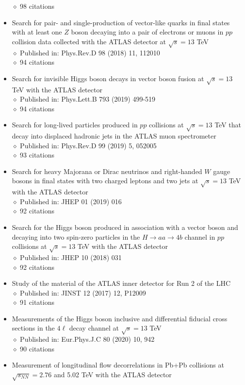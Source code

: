 \documentclass[margin, 10pt]{res} %
\begin{document}
\begin{resume}
\begin{itemize}
$\diamond$ 98 citations
\item Search for pair- and single-production of vector-like quarks in final states with at least one $Z$ boson decaying into a pair of electrons or muons in $pp$collision data collected with the ATLAS detector at $\sqrt{s} = 13$ TeV\\
$\diamond$ Published in: Phys.Rev.D 98 (2018) 11, 112010\\
$\diamond$ 94 citations
\item Search for invisible Higgs boson decays in vector boson fusion at $\sqrt{s} = 13$ TeV with the ATLAS detector\\
$\diamond$ Published in: Phys.Lett.B 793 (2019) 499-519\\
$\diamond$ 94 citations
\item Search for long-lived particles produced in $pp$ collisions at $\sqrt{s} = 13$ TeV that decay into displaced hadronic jets in the ATLAS muon spectrometer\\
$\diamond$ Published in: Phys.Rev.D 99 (2019) 5, 052005\\
$\diamond$ 93 citations
\item Search for heavy Majorana or Dirac neutrinos and right-handed $W$ gauge bosons in final states with two charged leptons and two jets at $\sqrt{s} = 13$ TeV with the ATLAS detector\\
$\diamond$ Published in: JHEP 01 (2019) 016\\
$\diamond$ 92 citations
\item Search for the Higgs boson produced in association with a vector boson and decaying into two spin-zero particles in the $H \rightarrow aa \rightarrow 4b$ channel in $pp$ collisions at $\sqrt{s} = 13$ TeV with the ATLAS detector\\
$\diamond$ Published in: JHEP 10 (2018) 031\\
$\diamond$ 92 citations
\item Study of the material of the ATLAS inner detector for Run 2 of the LHC\\
$\diamond$ Published in: JINST 12 (2017) 12, P12009\\
$\diamond$ 91 citations
\item Measurements of the Higgs boson inclusive and differential fiducial cross sections in the $4\ell$ decay channel at $\sqrt{s} = 13$ TeV\\
$\diamond$ Published in: Eur.Phys.J.C 80 (2020) 10, 942\\
$\diamond$ 90 citations
\item Measurement of longitudinal flow decorrelations in Pb+Pb collisions at $\sqrt{s_{NN}} = 2.76$ and 5.02 TeV with the ATLAS detector\\

\end{itemize}
\end{resume}
\end{document}
